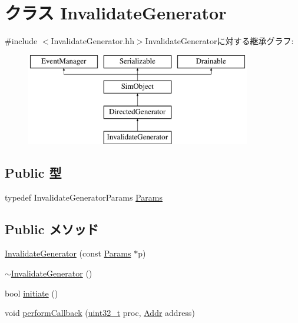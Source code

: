 \hypertarget{classInvalidateGenerator}{
\section{クラス InvalidateGenerator}
\label{classInvalidateGenerator}
}


{\ttfamily \#include $<$InvalidateGenerator.hh$>$}InvalidateGeneratorに対する継承グラフ:\begin{figure}[H]
\begin{center}
\leavevmode
\includegraphics[height=4cm]{classInvalidateGenerator}
\end{center}
\end{figure}
\subsection*{Public 型}
\begin{DoxyCompactItemize}
\item 
typedef InvalidateGeneratorParams \hyperlink{classInvalidateGenerator_ad11a79a813ce545d94f4464bebc395eb}{Params}
\end{DoxyCompactItemize}
\subsection*{Public メソッド}
\begin{DoxyCompactItemize}
\item 
\hyperlink{classInvalidateGenerator_a84e8459852f9bb78ad76461064c5478c}{InvalidateGenerator} (const \hyperlink{classInvalidateGenerator_ad11a79a813ce545d94f4464bebc395eb}{Params} $\ast$p)
\item 
\hyperlink{classInvalidateGenerator_ab35dfa6480e5b8341f6d117e8153f398}{$\sim$InvalidateGenerator} ()
\item 
bool \hyperlink{classInvalidateGenerator_a4f5ee6a9e0c2962dfc0b4bb1978e6d28}{initiate} ()
\item 
void \hyperlink{classInvalidateGenerator_a8c30329193052bf044bac8ee3e075475}{performCallback} (\hyperlink{Type_8hh_a435d1572bf3f880d55459d9805097f62}{uint32\_\-t} proc, \hyperlink{base_2types_8hh_af1bb03d6a4ee096394a6749f0a169232}{Addr} address)
\end{DoxyCompactItemize}
